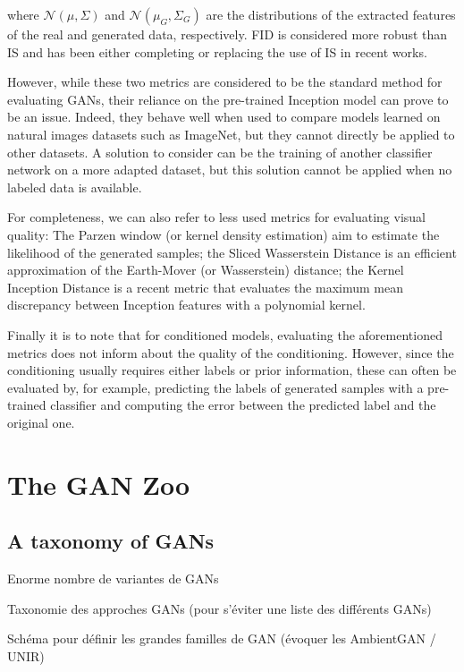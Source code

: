 where $\mathcal{N}(\mu, \Sigma)$ and $\mathcal{N}(\mu_G, \Sigma_G)$ are the distributions of the extracted features of the real and generated data, respectively. \ac{FID} is considered more robust than 
 \ac{IS} and has been either completing or replacing the use of \ac{IS} in recent works.
 
However, while these two metrics are considered to be the standard method for evaluating \ac{GAN}s, their reliance on the pre-trained Inception model can prove to be an issue. Indeed, they behave well when used to compare models learned on natural images datasets such as ImageNet, but they cannot directly be applied to other datasets. A solution to consider can be the training of another classifier network on a more adapted dataset, but this solution cannot be applied when no labeled data is available.

For completeness, we can also refer to less used metrics for evaluating visual quality: The Parzen window (or kernel density estimation) \citep{Parzen1962} aim to estimate the likelihood of the generated samples; the Sliced Wasserstein Distance \citep{Julien2011} is an efficient approximation of the Earth-Mover (or Wasserstein) distance; the  Kernel Inception Distance \citep{Binkowski2018} is a recent metric that evaluates the maximum mean discrepancy between Inception features with a polynomial kernel.

Finally it is to note that for conditioned models, evaluating the aforementioned metrics does not inform about the quality of the conditioning. However, since the conditioning usually requires either labels or prior information, these can often be evaluated by, for example, predicting the labels of generated samples with a pre-trained classifier and computing the error between the predicted label and the original one.


\section{The GAN Zoo}

\subsection{A taxonomy of GANs}
Enorme nombre de variantes de GANs

Taxonomie des approches GANs (pour s'éviter une liste des différents GANs)

Schéma pour définir les grandes familles de GAN (évoquer les AmbientGAN / UNIR)

